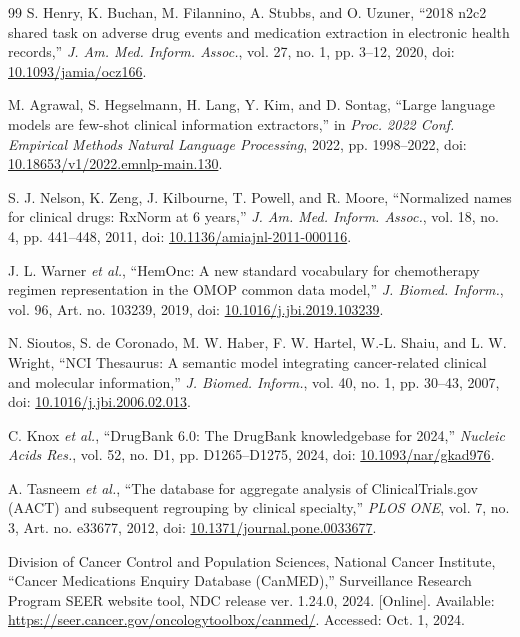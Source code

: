 \documentclass[conference]{IEEEtran}
\begin{document}
\begin{thebibliography}{99}
S. Henry, K. Buchan, M. Filannino, A. Stubbs, and O. Uzuner, ``2018 n2c2
shared task on adverse drug events and medication extraction in electronic
health records,'' \emph{J. Am. Med. Inform. Assoc.}, vol. 27, no. 1,
pp. 3--12, 2020, doi:
\href{https://doi.org/10.1093/jamia/ocz166}{10.1093/jamia/ocz166}.

M. Agrawal, S. Hegselmann, H. Lang, Y. Kim, and D. Sontag, ``Large language
models are few-shot clinical information extractors,'' in \emph{Proc. 2022
Conf. Empirical Methods Natural Language Processing}, 2022, pp. 1998--2022,
doi: \href{https://doi.org/10.18653/v1/2022.emnlp-main.130}{10.18653/v1/2022.emnlp-main.130}.

S. J. Nelson, K. Zeng, J. Kilbourne, T. Powell, and R. Moore, ``Normalized
names for clinical drugs: RxNorm at 6 years,'' \emph{J. Am. Med. Inform.
Assoc.}, vol. 18, no. 4, pp. 441--448, 2011, doi:
\href{https://doi.org/10.1136/amiajnl-2011-000116}{10.1136/amiajnl-2011-000116}.

J. L. Warner \emph{et al.}, ``HemOnc: A new standard vocabulary for
chemotherapy regimen representation in the OMOP common data model,''
\emph{J. Biomed. Inform.}, vol. 96, Art. no. 103239, 2019, doi:
\href{https://doi.org/10.1016/j.jbi.2019.103239}{10.1016/j.jbi.2019.103239}.

N. Sioutos, S. de Coronado, M. W. Haber, F. W. Hartel, W.-L. Shaiu, and
L. W. Wright, ``NCI Thesaurus: A semantic model integrating cancer-related
clinical and molecular information,'' \emph{J. Biomed. Inform.}, vol. 40,
no. 1, pp. 30--43, 2007, doi:
\href{https://doi.org/10.1016/j.jbi.2006.02.013}{10.1016/j.jbi.2006.02.013}.

C. Knox \emph{et al.}, ``DrugBank 6.0: The DrugBank knowledgebase for 2024,''
\emph{Nucleic Acids Res.}, vol. 52, no. D1, pp. D1265--D1275, 2024, doi:
\href{https://doi.org/10.1093/nar/gkad976}{10.1093/nar/gkad976}.

A. Tasneem \emph{et al.}, ``The database for aggregate analysis of
ClinicalTrials.gov (AACT) and subsequent regrouping by clinical specialty,''
\emph{PLOS ONE}, vol. 7, no. 3, Art. no. e33677, 2012, doi:
\href{https://doi.org/10.1371/journal.pone.0033677}{10.1371/journal.pone.0033677}.

Division of Cancer Control and Population Sciences, National Cancer Institute,
``Cancer Medications Enquiry Database (CanMED),'' Surveillance Research
Program SEER website tool, NDC release ver. 1.24.0, 2024. [Online]. Available:
\url{https://seer.cancer.gov/oncologytoolbox/canmed/}. Accessed: Oct. 1, 2024.


\end{thebibliography}
\end{document}
